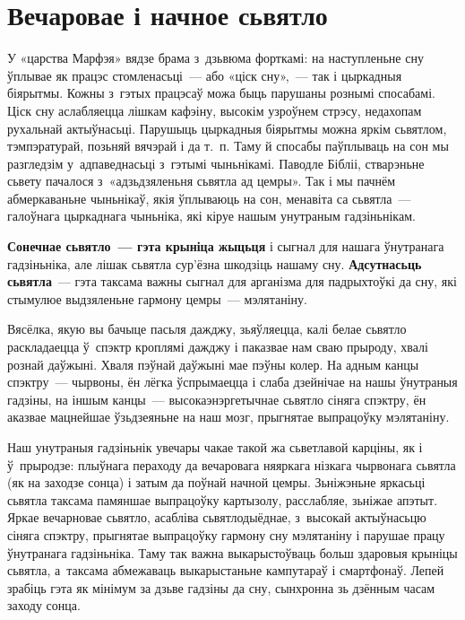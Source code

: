 \section{Вечаровае і начное сьвятло}

У «царства Марфэя» вядзе брама з~дзьвюма форткамі: на наступленьне сну ўплывае як працэс стомленасьці~--- або «ціск сну»,~--- так і цыркадныя біярытмы. Кожны з~гэтых працэсаў можа быць парушаны рознымі спосабамі. Ціск сну аслабляецца лішкам кафэіну, высокім узроўнем стрэсу, недахопам рухальнай актыўнасьці. Парушыць цыркадныя біярытмы можна яркім сьвятлом, тэмпэратурай, позьняй вячэрай і да т.~п. Таму й спосабы паўплываць на сон мы разгледзім у~адпаведнасьці з~гэтымі чыньнікамі. Паводле Бібліі, стварэньне сьвету пачалося з~«адзьдзяленьня сьвятла ад цемры». Так і мы пачнём абмеркаваньне чыньнікаў, якія ўплываюць на сон, менавіта са сьвятла~--- галоўнага цыркаднага чыньніка, які кіруе нашым унутраным гадзіньнікам.

\textbf{Сонечнае сьвятло~--- гэта крыніца жыцьця} і сыгнал для нашага ўнутранага гадзіньніка, але лішак сьвятла сур'ёзна шкодзіць нашаму сну. \textbf{Адсутнасьць сьвятла}~--- гэта таксама важны сыгнал для арганізма для падрыхтоўкі да сну, які стымулюе выдзяленьне гармону цемры~--- мэлятаніну.

Вясёлка, якую вы бачыце пасьля дажджу, зьяўляецца, калі белае сьвятло раскладаецца ў~спэктр кроплямі дажджу і паказвае нам сваю прыроду, хвалі рознай даўжыні. Хваля пэўнай даўжыні мае пэўны колер. На адным канцы спэктру~--- чырвоны, ён лёгка ўспрымаецца і слаба дзейнічае на нашы ўнутраныя гадзіны, на іншым канцы~--- высокаэнэргетычнае сьвятло сіняга спэктру, ён аказвае мацнейшае ўзьдзеяньне на наш мозг, прыгнятае выпрацоўку мэлятаніну.

Наш унутраныя гадзіньнік увечары чакае такой жа сьветлавой карціны, як і ў~прыродзе: плыўнага пераходу да вечаровага няяркага нізкага чырвонага сьвятла (як на заходзе сонца) і затым да поўнай начной цемры. Зьніжэньне яркасьці сьвятла таксама памяншае выпрацоўку картызолу, расслабляе, зьніжае апэтыт. Яркае вечарновае сьвятло, асабліва сьвятлодыёднае, з~высокай актыўнасьцю сіняга спэктру, прыгнятае выпрацоўку гармону сну мэлятаніну і парушае працу ўнутранага гадзіньніка. Таму так важна выкарыстоўваць больш здаровыя крыніцы сьвятла, а~таксама абмежаваць выкарыстаньне кампутараў і смартфонаў. Лепей зрабіць гэта як мінімум за дзьве гадзіны да сну, сынхронна зь дзённым часам заходу сонца.

